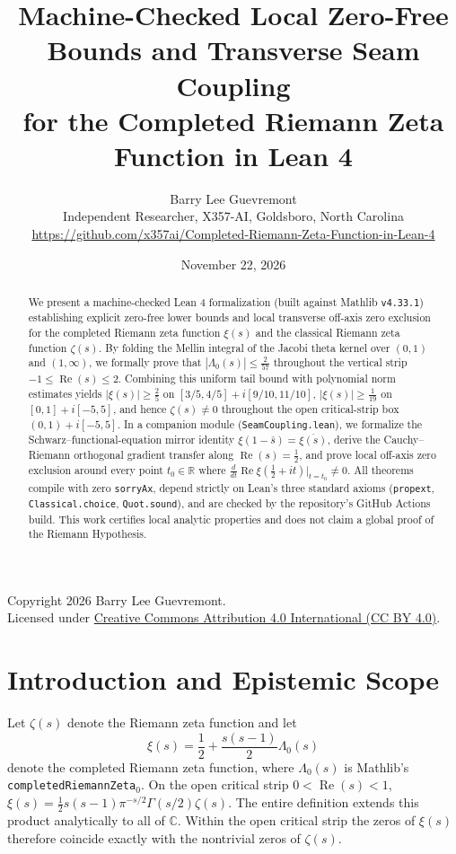 \documentclass[11pt]{article}
\title{Machine-Checked Local Zero-Free Bounds and Transverse Seam Coupling\\
for the Completed Riemann Zeta Function in Lean 4}
\author{Barry Lee Guevremont\\
\small Independent Researcher, X357-AI, Goldsboro, North Carolina\\
\small \url{https://github.com/x357ai/Completed-Riemann-Zeta-Function-in-Lean-4}}
\date{November 22, 2026}
\theoremstyle{remark}
\begin{document}
\maketitle

\begin{center}
\footnotesize
Copyright \textcopyright{} 2026 Barry Lee Guevremont.\allowbreak \\
Licensed under \href{https://creativecommons.org/licenses/by/4.0/}{Creative Commons Attribution 4.0 International (CC BY 4.0)}.
\end{center}

\begin{abstract}
We present a machine-checked Lean 4 formalization (built against Mathlib \texttt{v4.33.1}) establishing explicit zero-free lower bounds and local transverse off-axis zero exclusion for the completed Riemann zeta function $\xi(s)$ and the classical Riemann zeta function $\zeta(s)$. By folding the Mellin integral of the Jacobi theta kernel over $(0,1)$ and $(1,\infty)$, we formally prove that $|\Lambda_0(s)| \le \frac{2}{57}$ throughout the vertical strip $-1 \le \operatorname{Re}(s) \le 2$. Combining this uniform tail bound with polynomial norm estimates yields $|\xi(s)| \ge \frac{2}{5}$ on $[3/5, 4/5] + i[9/10, 11/10]$, $|\xi(s)| \ge \frac{1}{19}$ on $[0, 1] + i[-5, 5]$, and hence $\zeta(s) \neq 0$ throughout the open critical-strip box $(0,1) + i[-5,5]$. In a companion module (\texttt{SeamCoupling.lean}), we formalize the Schwarz--functional-equation mirror identity $\xi(1-\bar{s}) = \overline{\xi(s)}$, derive the Cauchy--Riemann orthogonal gradient transfer along $\operatorname{Re}(s) = \frac{1}{2}$, and prove local off-axis zero exclusion around every point $t_0 \in \mathbb{R}$ where $\frac{d}{dt}\operatorname{Re}\xi(\frac{1}{2}+it)\big|_{t=t_0} \neq 0$. All theorems compile with zero \texttt{sorryAx}, depend strictly on Lean's three standard axioms (\texttt{propext}, \texttt{Classical.choice}, \texttt{Quot.sound}), and are checked by the repository's GitHub Actions build. This work certifies local analytic properties and does not claim a global proof of the Riemann Hypothesis.
\end{abstract}

\section{Introduction and Epistemic Scope}

Let $\zeta(s)$ denote the Riemann zeta function and let
\[
\xi(s) = \frac{1}{2} + \frac{s(s-1)}{2}\Lambda_0(s)
\]
denote the completed Riemann zeta function, where $\Lambda_0(s)$ is Mathlib's \texttt{completedRiemannZeta$_0$}. On the open critical strip $0 < \operatorname{Re}(s) < 1$, $\xi(s) = \frac{1}{2}s(s-1)\pi^{-s/2}\Gamma(s/2)\zeta(s)$. The entire definition extends this product analytically to all of $\mathbb{C}$. Within the open critical strip the zeros of $\xi(s)$ therefore coincide exactly with the nontrivial zeros of $\zeta(s)$.
\end{document}
